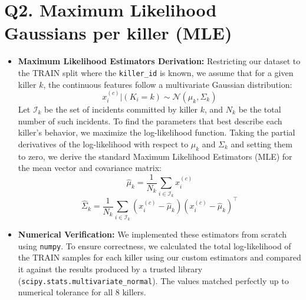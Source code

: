 \documentclass{article}
\begin{document}
\section*{Q2. Maximum Likelihood Gaussians per killer (MLE)}
\begin{itemize}
\item \textbf{Maximum Likelihood Estimators Derivation:} 
Restricting our dataset to the TRAIN split where the \texttt{killer\_id} is known, we assume that for a given killer $k$, the continuous features follow a multivariate Gaussian distribution:
\begin{equation}
    x_{i}^{(c)}|(K_{i}=k) \sim \mathcal{N}(\mu_{k},\Sigma_{k})
\end{equation}
Let $\mathcal{I}_k$ be the set of incidents committed by killer $k$, and $N_k$ be the total number of such incidents. To find the parameters that best describe each killer's behavior, we maximize the log-likelihood function. Taking the partial derivatives of the log-likelihood with respect to $\mu_k$ and $\Sigma_k$ and setting them to zero, we derive the standard Maximum Likelihood Estimators (MLE) for the mean vector and covariance matrix:
\begin{equation}
    \hat{\mu}_{k} = \frac{1}{N_{k}}\sum_{i\in \mathcal{I}_{k}}x_{i}^{(c)}
\end{equation}
\begin{equation}
    \hat{\Sigma}_{k} = \frac{1}{N_{k}}\sum_{i\in\mathcal{I}_{k}}(x_{i}^{(c)}-\hat{\mu}_{k})(x_{i}^{(c)}-\hat{\mu}_{k})^{\top}
\end{equation}

\item \textbf{Numerical Verification:}
We implemented these estimators from scratch using \texttt{numpy}. To ensure correctness, we calculated the total log-likelihood of the TRAIN samples for each killer using our custom estimators and compared it against the results produced by a trusted library (\texttt{scipy.stats.multivariate\_normal}). The values matched perfectly up to numerical tolerance for all 8 killers.


\end{itemize}
\end{document}
